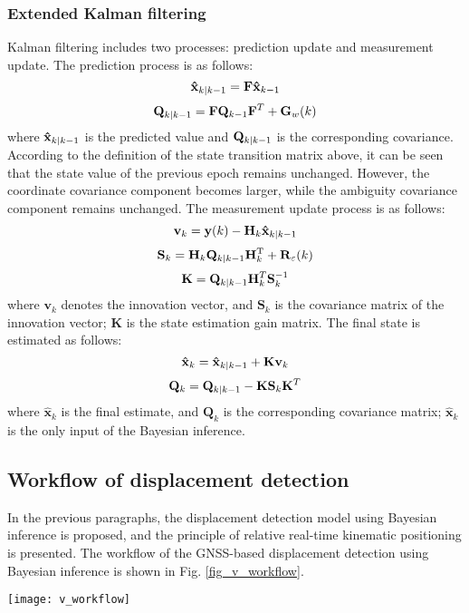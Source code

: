 \documentclass[final,3p,times]{elsarticle}
\begin{document}
	\subsubsection{Extended Kalman filtering}
	Kalman filtering includes two processes: prediction update and measurement update\cite{grewal2001kalman}. The prediction process is as follows:
	\begin{equation}
	{{\bf{\hat x}}_{k|k - 1}} = {\bf{F}}{{\bf{\hat x}}_{k - 1}}
	\end{equation}
	\begin{equation}
	{{\bf{Q}}_{k|k - 1}} = {\bf{F}}{{\bf{Q}}_{k - 1}}{{\bf{F}}^T} + {{\bf{G}}_w}(k)
	\end{equation}
	where ${\bf{\hat x}}_{k|k - 1}$ is the predicted value and ${\bf{Q}}_{k|k - 1}$ is the corresponding covariance. According to the definition of the state transition matrix above, it can be seen that the state value of the previous epoch remains unchanged. However, the coordinate covariance component becomes larger, while the ambiguity covariance component remains unchanged. The measurement update process is as follows:
	\begin{equation}
	{{\bf{v}}_k} = {\bf{y}}(k) - {\bf{H}}_k{{\bf{\hat x}}_{k|k - 1}}
	\end{equation}
	\begin{equation}
	{{\bf{S}}_k} = {\bf{H}}_k{{\bf{Q}}_{k|k - 1}}{\bf{H}}{_k^{\rm{T}}} + {{\bf{R}}_\varepsilon }(k)
	\end{equation}
	\begin{equation}
	{\bf{K}} = {{\bf{Q}}_{k|k - 1}}{\bf{H}}_k^T{\bf{S}}_k^{ - 1}
	\end{equation}
	where ${{\mathbf{v}}_{k}}$ denotes the innovation vector, and ${{\mathbf{S}}_{k}}$ is the covariance matrix of the innovation vector; $\mathbf{K}$ is the state estimation gain matrix. The final state is estimated as follows:
	\begin{equation}
	{{\bf{\hat x}}_k} = {{\bf{\hat x}}_{k|k - 1}} + {\bf{K}}{{\bf{v}}_k}
	\end{equation}
	\begin{equation}
	{{\bf{Q}}_k} = {{\bf{Q}}_{k|k - 1}} - {\bf{K}}{{\bf{S}}_k}{{\bf{K}}^T}
	\end{equation}
	where ${{\mathbf{\hat{x}}}_{k}}$ is the final estimate, and ${{\mathbf{Q}}_{k}}$ is the corresponding covariance matrix; ${{\mathbf{\hat{x}}}_{k}}$ is the only input of the Bayesian inference.
	
	\subsection{Workflow of displacement detection }  
	In the previous paragraphs, the displacement detection model using Bayesian inference is proposed, and the principle of relative real-time kinematic positioning is presented.
	The workflow of the GNSS-based displacement detection using Bayesian inference is shown in Fig. \ref{fig_v_workflow}.
	\begin{figure*}[htpb]
		\centering
		\texttt{[image: v\_workflow]}
		\caption{Bayesian model for displacement detection.}
		\label{fig_v_workflow}
	\end{figure*} 
	
\end{document}
